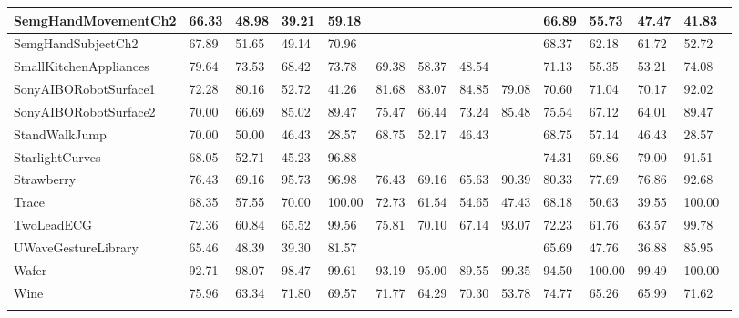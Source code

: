 \begin{landscape}
\begin{longtable}{|l|llll|llll|llll|}
      SemgHandMovementCh2 & 66.33 & 48.98 & 39.21 & 59.18 &   &   &   &   & 66.89 & 55.73 & 47.47 & 41.83 \\ \hline
      SemgHandSubjectCh2 & 67.89 & 51.65 & 49.14 & 70.96 &   &   &   &   & 68.37 & 62.18 & 61.72 & 52.72 \\ \hline
      SmallKitchenAppliances & 79.64 & 73.53 & 68.42 & 73.78 & 69.38 & 58.37 & 48.54 &   & 71.13 & 55.35 & 53.21 & 74.08 \\ \hline
      SonyAIBORobotSurface1 & 72.28 & 80.16 & 52.72 & 41.26 & 81.68 & 83.07 & 84.85 & 79.08 & 70.60 & 71.04 & 70.17 & 92.02 \\ \hline
      SonyAIBORobotSurface2 & 70.00 & 66.69 & 85.02 & 89.47 & 75.47 & 66.44 & 73.24 & 85.48 & 75.54 & 67.12 & 64.01 & 89.47 \\ \hline
      StandWalkJump & 70.00 & 50.00 & 46.43 & 28.57 & 68.75 & 52.17 & 46.43 &   & 68.75 & 57.14 & 46.43 & 28.57 \\ \hline
      StarlightCurves & 68.05 & 52.71 & 45.23 & 96.88 &   &   &   &   & 74.31 & 69.86 & 79.00 & 91.51 \\ \hline
      Strawberry & 76.43 & 69.16 & 95.73 & 96.98 & 76.43 & 69.16 & 65.63 & 90.39 & 80.33 & 77.69 & 76.86 & 92.68 \\ \hline
      Trace & 68.35 & 57.55 & 70.00 & 100.00 & 72.73 & 61.54 & 54.65 & 47.43 & 68.18 & 50.63 & 39.55 & 100.00 \\ \hline
      TwoLeadECG & 72.36 & 60.84 & 65.52 & 99.56 & 75.81 & 70.10 & 67.14 & 93.07 & 72.23 & 61.76 & 63.57 & 99.78 \\ \hline
      UWaveGestureLibrary & 65.46 & 48.39 & 39.30 & 81.57 &   &   &   &   & 65.69 & 47.76 & 36.88 & 85.95 \\ \hline
      Wafer & 92.71 & 98.07 & 98.47 & 99.61 & 93.19 & 95.00 & 89.55 & 99.35 & 94.50 & 100.00 & 99.49 & 100.00 \\ \hline
      Wine & 75.96 & 63.34 & 71.80 & 69.57 & 71.77 & 64.29 & 70.30 & 53.78 & 74.77 & 65.26 & 65.99 & 71.62 \\ \hline
    \label{tab:longresults}
    \end{longtable}
\end{landscape}

